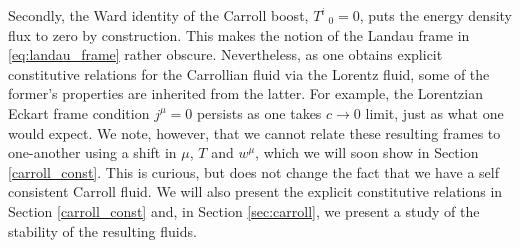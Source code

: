 \documentclass[superscriptaddress,prd,nofootinbib,preprintnumbers,longbibliography,11pt,eqsecnum]{revtex4-1}
\begin{document}
Secondly, the Ward identity of the Carroll boost, $T^{i}_{\;\;\,0}=0$, puts the energy density flux to zero by construction. This makes the notion of the Landau frame in \eqref{eq:landau_frame} rather obscure. Nevertheless, as one obtains explicit constitutive relations for the Carrollian fluid via the Lorentz fluid, some of the former's properties are inherited from the latter. For example, the Lorentzian Eckart frame condition $j^\mu = 0$ persists as one takes $c\to 0$ limit, just as what one would expect. We note, however, that we cannot relate these resulting frames to one-another using a shift in $\mu$, $T$ and $w^{\mu}$, which we will soon show in Section \ref{carroll_const}. This is curious, but does not change the fact that we have a self consistent Carroll fluid. We will also present the explicit constitutive relations in Section \ref{carroll_const} and, in Section \ref{sec:carroll}, we present a study of the stability of the resulting fluids.
\end{document}
